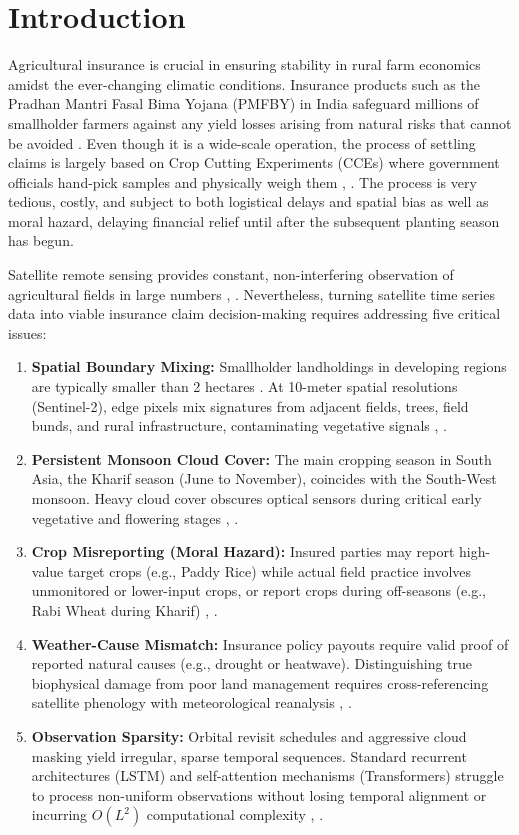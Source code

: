 \documentclass[conference]{IEEEtran}
\begin{document}
\section{Introduction}
Agricultural insurance is crucial in ensuring stability in rural farm economics amidst the ever-changing climatic conditions. Insurance products such as the Pradhan Mantri Fasal Bima Yojana (PMFBY) in India safeguard millions of smallholder farmers against any yield losses arising from natural risks that cannot be avoided \cite{b6}. Even though it is a wide-scale operation, the process of settling claims is largely based on Crop Cutting Experiments (CCEs) where government officials hand-pick samples and physically weigh them \cite{b2}, \cite{b11}. The process is very tedious, costly, and subject to both logistical delays and spatial bias as well as moral hazard, delaying financial relief until after the subsequent planting season has begun.

Satellite remote sensing provides constant, non-interfering observation of agricultural fields in large numbers \cite{b11}, \cite{b20}. Nevertheless, turning satellite time series data into viable insurance claim decision-making requires addressing five critical issues:

\begin{enumerate}
\item \textbf{Spatial Boundary Mixing:} Smallholder landholdings in developing regions are typically smaller than 2 hectares \cite{b18}. At 10-meter spatial resolutions (Sentinel-2), edge pixels mix signatures from adjacent fields, trees, field bunds, and rural infrastructure, contaminating vegetative signals \cite{b18}, \cite{b20}.
\item \textbf{Persistent Monsoon Cloud Cover:} The main cropping season in South Asia, the Kharif season (June to November), coincides with the South-West monsoon. Heavy cloud cover obscures optical sensors during critical early vegetative and flowering stages \cite{b1}, \cite{b4}.
\item \textbf{Crop Misreporting (Moral Hazard):} Insured parties may report high-value target crops (e.g., Paddy Rice) while actual field practice involves unmonitored or lower-input crops, or report crops during off-seasons (e.g., Rabi Wheat during Kharif) \cite{b7}, \cite{b9}.
\item \textbf{Weather-Cause Mismatch:} Insurance policy payouts require valid proof of reported natural causes (e.g., drought or heatwave). Distinguishing true biophysical damage from poor land management requires cross-referencing satellite phenology with meteorological reanalysis \cite{b13}, \cite{b16}.
\item \textbf{Observation Sparsity:} Orbital revisit schedules and aggressive cloud masking yield irregular, sparse temporal sequences. Standard recurrent architectures (LSTM) and self-attention mechanisms (Transformers) struggle to process non-uniform observations without losing temporal alignment or incurring $O(L^2)$ computational complexity \cite{b1}, \cite{b5}.
\end{enumerate}
\end{document}
